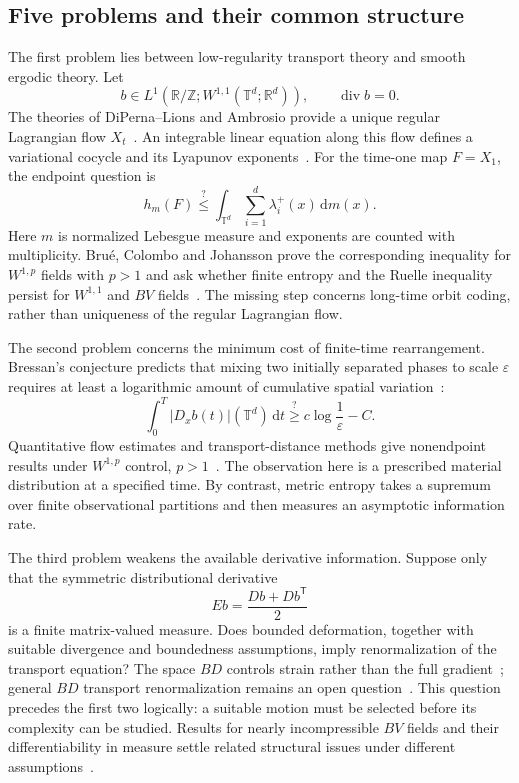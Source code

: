 \documentclass[review,12pt,times,a4paper,nopreprintline]{elsarticle}
\theoremstyle{plain}
\theoremstyle{definition}
\theoremstyle{remark}
\newcommand{\T}{\mathbb T}
\newcommand{\R}{\mathbb R}
\newcommand{\Z}{\mathbb Z}
\newcommand{\dd}{\,\mathrm d}
\newcommand{\diver}{\operatorname{div}}
\numberwithin{equation}{section}
\begin{document}
\subsection{Five problems and their common structure}
The first problem lies between low-regularity transport theory and smooth ergodic theory. Let
\[
 b\in L^1(\R/\Z;W^{1,1}(\T^d;\R^d)),\qquad \diver b=0.
\]
The theories of DiPerna--Lions and Ambrosio provide a unique regular Lagrangian flow $X_t$~\cite{DL,Ambrosio}. An integrable linear equation along this flow defines a variational cocycle and its Lyapunov exponents~\cite{LeBrisLions}. For the time-one map $F=X_1$, the endpoint question is
\begin{equation}\label{eq:introentropy}
 h_m(F)\stackrel{?}{\leq}\int_{\T^d}\sum_{i=1}^d\lambda_i^+(x)\dd m(x).
\end{equation}
Here $m$ is normalized Lebesgue measure and exponents are counted with multiplicity. Bru\'e, Colombo and Johansson prove the corresponding inequality for $W^{1,p}$ fields with $p>1$ and ask whether finite entropy and the Ruelle inequality persist for $W^{1,1}$ and $BV$ fields~\cite[Theorem 1.2 and Question 1.3]{BCJ}. The missing step concerns long-time orbit coding, rather than uniqueness of the regular Lagrangian flow.

The second problem concerns the minimum cost of finite-time rearrangement. Bressan's conjecture predicts that mixing two initially separated phases to scale $\varepsilon$ requires at least a logarithmic amount of cumulative spatial variation~\cite{Bressan}:
\begin{equation}\label{eq:intromixing}
 \int_0^T|D_xb(t)|(\T^d)\dd t
 \stackrel{?}{\geq}c\log\frac1\varepsilon-C.
\end{equation}
Quantitative flow estimates and transport-distance methods give nonendpoint results under $W^{1,p}$ control, $p>1$~\cite{CrippaDeLellis,Seis,Leger}. The observation here is a prescribed material distribution at a specified time. By contrast, metric entropy takes a supremum over finite observational partitions and then measures an asymptotic information rate.

The third problem weakens the available derivative information. Suppose only that the symmetric distributional derivative
\[
 Eb=\frac{Db+Db^{\mathsf T}}2
\]
is a finite matrix-valued measure. Does bounded deformation, together with suitable divergence and boundedness assumptions, imply renormalization of the transport equation? The space $BD$ controls strain rather than the full gradient~\cite{ACDM}; general $BD$ transport renormalization remains an open question~\cite{Inversi}. This question precedes the first two logically: a suitable motion must be selected before its complexity can be studied. Results for nearly incompressible $BV$ fields and their differentiability in measure settle related structural issues under different assumptions~\cite{BianchiniBonicatto,BianchiniDeNitti}.
\end{document}
